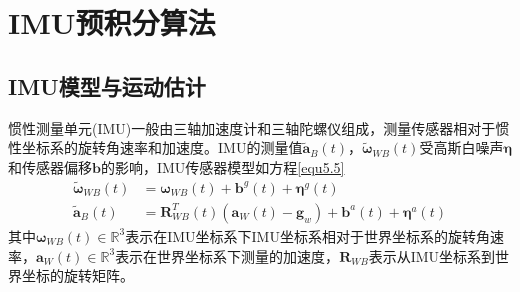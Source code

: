 \section{IMU预积分算法}

\subsection{IMU模型与运动估计}
惯性测量单元(IMU)一般由三轴加速度计和三轴陀螺仪组成，测量传感器相对于惯性坐标系的旋转角速率和加速度。IMU的测量值$\widetilde{\boldsymbol{a}}_B(t)$，$\widetilde{\boldsymbol{\omega}}_{W\!B}(t)$受高斯白噪声$\boldsymbol{\eta}$和传感器偏移$\boldsymbol{b}$的影响，IMU传感器模型如方程\eqref{equ5.5}
\begin{equation}
\label{equ5.5}
\begin{aligned}
\widetilde{\boldsymbol{\omega}}_{W\!B}(t) &= \boldsymbol{\omega}_{W\!B}(t)+\boldsymbol{b}^g(t)+\boldsymbol{\eta}^g(t) \\
\widetilde{\boldsymbol{a}}_B(t) &= \boldsymbol{R}_{W\!B}^T(t)(\boldsymbol{a}_W(t)-\boldsymbol{g}_w)+\boldsymbol{b}^a(t)+\boldsymbol{\eta}^a(t)
\end{aligned}
\end{equation}
其中$\boldsymbol{\omega}_{W\!B}(t) \in \mathds{R}^3$表示在IMU坐标系下IMU坐标系相对于世界坐标系的旋转角速率，$\boldsymbol{a}_W(t) \in \mathds{R}^3$表示在世界坐标系下测量的加速度，$\boldsymbol{R}_{W\!B}$表示从IMU坐标系到世界坐标的旋转矩阵。

